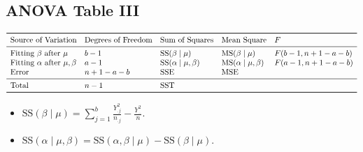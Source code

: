 \subsection*{ANOVA Table III}
\[ \begin{array}{lllll}
        \toprule
        \text{Source of Variation}                    & \text{Degrees of Freedom} & \text{Sum of Squares}           & \text{Mean Square}              & F              \\
        \midrule
        \text{Fitting }\beta\text{ after }\mu         & b-1                       & \text{SS}(\beta\mid \mu)        & \text{MS}(\beta\mid \mu)        & F(b-1,n+1-a-b) \\
        \text{Fitting }\alpha \text{ after }\mu,\beta & a-1                       & \text{SS}(\alpha\mid \mu,\beta) & \text{MS}(\alpha\mid \mu,\beta) & F(a-1,n+1-a-b) \\
        \text{Error}                                  & n+1-a-b                   & \SSE                            & \MSE                                             \\
        \midrule
        \text{Total}                                  & n-1                       & \SST                                                                               \\
        \bottomrule
    \end{array} \]
\begin{itemize}
    \item $ \text{SS}(\beta\mid \mu) =\sum_{j=1}^{b}\frac{Y_{.j}^2}{n_{.j}}-\frac{Y_{..}^2}{n} $.
    \item $ \text{SS}(\alpha\mid \mu,\beta) =\text{SS}(\alpha,\beta\mid \mu)-\text{SS}(\beta\mid \mu) $.
\end{itemize}
